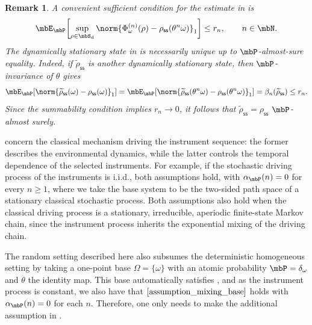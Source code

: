 \documentclass[a4paper]{article}
\numberwithin{equation}{section}   %
\theoremstyle{plain}   %
\theoremstyle{plain}   %
\newtheorem{remark}[lemma]{Remark}   %
\theoremstyle{examplestyle}
\DeclareMathOperator{\states}{\mbS_d}   %
\DeclareMathOperator{\pr}{\mbP}           %
\newcommand{\s}{\rho_{\mathsf{ss}}}     %
\begin{document}
    \begin{remark}
        A convenient sufficient condition for the estimate in  is
        \[
            \mbE_{\pr}\!\left[
                \sup_{\rho\in\states}
                \norm{
                    \Phi^{(n)}_\omega(\rho)
                    -
                    \s(\theta^n\omega)
                }_1
            \right]
            \le
            r_n,
            \qquad n\in\mbN.
        \]
        The dynamically stationary state in  is necessarily unique up to \(\pr\)-almost-sure equality.
        Indeed, if \(\widetilde\s\) is another dynamically stationary state, then \(\pr\)-invariance of \(\theta\) gives
        \[
            \mbE_{\pr}\!\left[
                \norm{\widetilde\s(\omega)-\s(\omega)}_1
            \right]
            =
            \mbE_{\pr}\!\left[
                \norm{
                    \widetilde\s(\theta^n\omega)-\s(\theta^n\omega)
                }_1
            \right]
            =
            \beta_n(\widetilde\s)
            \le
            r_n.
        \]
        Since the summability condition implies \(r_n\to0\), it follows that \(\widetilde\s=\s\) \(\pr\)-almost surely.
    \end{remark}
    
     concern the classical mechanism driving the instrument sequence: the former describes the environmental dynamics, while the latter controls the temporal dependence of the selected instruments.
    For example, if the stochastic driving process of the instruments is i.i.d., both assumptions hold, with $\alpha_{\pr}(n)=0$ for every $n\ge1$, where we take the base system to be the two-sided path space of a stationary classical stochastic process.
    Both assumptions also hold when the classical driving process is a stationary, irreducible, aperiodic finite-state Markov chain, since the instrument process inherits the exponential mixing of the driving chain.

    The random setting described here also subsumes the deterministic homogeneous setting by taking a one-point base $\Omega = \{\omega\}$ with an atomic probability $\pr = \delta_\omega$ and $\theta$ the identity map. 
    This base automatically satisfies , and as the instrument process is constant, we also have that $\Cref{assumption_mixing_base}$ holds with $\alpha_{\pr}(n) = 0$ for each $n$. 
    Therefore, one only needs to make the additional assumption in .  
\end{document}
